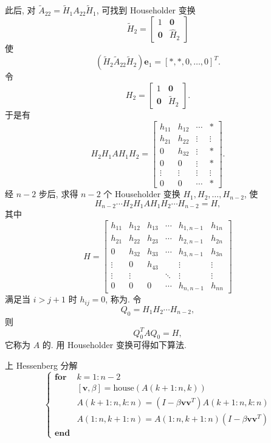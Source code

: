 此后, 对 $\widetilde{A}_{22}=\widetilde{H}_1A_{22}\widetilde{H}_1$, 可找到 Householder 变换
\[
  \widetilde{H}_2=\begin{bmatrix}
    1 & \mathbf{0}\\
    \mathbf{0} & \widehat{H}_2
  \end{bmatrix}
\]
使
\[
  (\widetilde{H}_2\widetilde{A}_{22}\widetilde{H}_2)\mathbf{e}_1
  =[*,*,0,\ldots,0]^T.
\]
令
\[
  H_2=\begin{bmatrix}
    1 & \mathbf{0}\\
    \mathbf{0} & \widetilde{H}_2
  \end{bmatrix}.
\]
于是有
\[
  H_2H_1AH_1H_2=\begin{bmatrix}
    h_{11} & h_{12} & \cdots & *\\
    h_{21} & h_{22} & \vdots & \vdots\\
    0 & h_{32} & \vdots & *\\
    0 & 0 & \vdots & *\\
    \vdots & \vdots & \vdots & \vdots\\
    0 & 0 & \cdots & *
  \end{bmatrix}.
\]
经 $n-2$ 步后, 求得 $n-2$ 个 Householder 变换 $H_1,H_2,\ldots,H_{n-2}$, 使
\[
  H_{n-2}\cdots H_2H_1AH_1H_2\cdots H_{n-2}=H,
\]
其中
\[
  H=\begin{bmatrix}
    h_{11} & h_{12} & h_{13} & \cdots & h_{1,n-1} & h_{1n}\\
    h_{21} & h_{22} & h_{23} & \cdots & h_{2,n-1} & h_{2n}\\
    0 & h_{32} & h_{33} & \cdots & h_{3,n-1} & h_{3n}\\
    \vdots & 0 & h_{43} & & \vdots & \vdots\\
    \vdots & \vdots & & \ddots & \vdots & \vdots\\
    0 & 0 & 0 & \cdots & h_{n,n-1} & h_{nn}
  \end{bmatrix}
\]
满足当 $i>j+1$ 时 $h_{ij}=0$, 称为. 令
\[
  Q_0=H_1H_2\cdots H_{n-2},
\]
则
\[
  Q_0^TAQ_0=H,
\]
它称为 $A$ 的. 用 Householder 变换可得如下算法.

\begin{algorithm}{上 Hessenberg 分解}
  \label{alg:7-1}
  \[
    \left\{
    \begin{array}{ll}
      \textbf{for} & k=1:n-2\\
        & [\mathbf{v},\beta]=\mathrm{house}(A(k+1:n,k))\\
        & A(k+1:n,k:n)=(I-\beta\mathbf{v}\mathbf{v}^T)A(k+1:n,k:n)\\
        & A(1:n,k+1:n)=A(1:n,k+1:n)(I-\beta\mathbf{v}\mathbf{v}^T)\\
      \textbf{end}
    \end{array}
    \right.
  \]
\end{algorithm}

